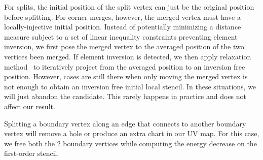 For splits, the initial position of the split vertex can just be the original position before splitting. For corner merges, however, the merged vertex must have a locally-injective initial position. Instead of potentially minimizing a distance measure subject to a set of linear inequality constraints preventing element inversion, we first pose the merged vertex to the averaged position of the two vertices been merged. If element inversion is detected, we then apply relaxation method~\cite{Agmon1954Relaxation} to iteratively project from the averaged position to an inversion free position. However, cases are still there when only moving the merged vertex is not enough to obtain an inversion free initial local stencil. In these situations, we will just abandon the candidate. This rarely happens in practice and does not affect our result.

Splitting a boundary vertex along an edge that connects to another boundary vertex will remove a hole or produce an extra chart in our UV map. For this case, we free both the 2 boundary vertices while computing the energy decrease on the first-order stencil. 